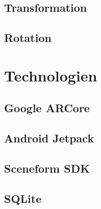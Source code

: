 \subsection{Transformation}
\subsection{Rotation}

\section{Technologien}
\label{chap:Technologien}
\subsection{Google ARCore}
\subsection{Android Jetpack}
\subsection{Sceneform SDK}
\subsection{SQLite}


